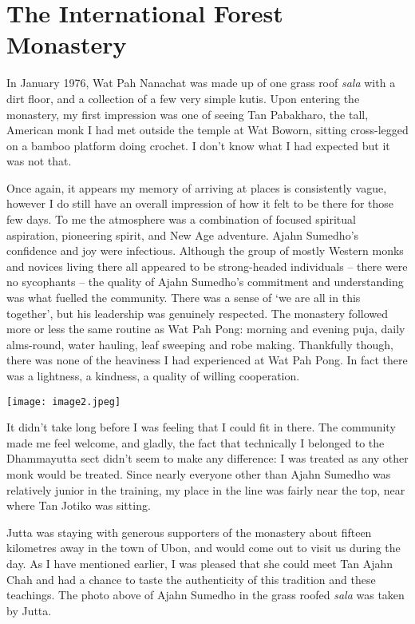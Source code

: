 \chapter{The International Forest Monastery}

In January 1976, Wat Pah Nanachat was made up of one grass roof
\emph{sala} with a dirt floor, and a collection of a few very simple
kutis. Upon entering the monastery, my first impression was one of
seeing Tan Pabakharo, the tall, American monk I had met outside the
temple at Wat Boworn, sitting cross-legged on a bamboo platform doing
crochet. I don't know what I had expected but it was not that.

Once again, it appears my memory of arriving at places is consistently
vague, however I do still have an overall impression of how it felt to
be there for those few days. To me the atmosphere was a combination of
focused spiritual aspiration, pioneering spirit, and New Age adventure.
Ajahn Sumedho's confidence and joy were infectious. Although the group
of mostly Western monks and novices living there all appeared to be
strong-headed individuals -- there were no sycophants -- the quality of
Ajahn Sumedho's commitment and understanding was what fuelled the
community. There was a sense of `we are all in this together', but his
leadership was genuinely respected. The monastery followed more or less
the same routine as Wat Pah Pong: morning and evening puja, daily
alms-round, water hauling, leaf sweeping and robe making. Thankfully
though, there was none of the heaviness I had experienced at Wat Pah
Pong. In fact there was a lightness, a kindness, a quality of willing
cooperation.

\texttt{[image: image2.jpeg]}

It didn't take long before I was feeling that I could fit in there. The
community made me feel welcome, and gladly, the fact that technically I
belonged to the Dhammayutta sect didn't seem to make any difference: I
was treated as any other monk would be treated. Since nearly everyone
other than Ajahn Sumedho was relatively junior in the training, my place
in the line was fairly near the top, near where Tan Jotiko was sitting.

Jutta was staying with generous supporters of the monastery about
fifteen kilometres away in the town of Ubon, and would come out to visit
us during the day. As I have mentioned earlier, I was pleased that she
could meet Tan Ajahn Chah and had a chance to taste the authenticity of
this tradition and these teachings. The photo above of Ajahn Sumedho in
the grass roofed \emph{sala} was taken by Jutta.

